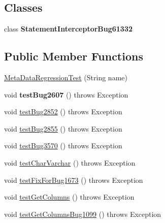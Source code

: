 \subsection*{Classes}
\begin{DoxyCompactItemize}
\item 
class {\bfseries Statement\+Interceptor\+Bug61332}
\end{DoxyCompactItemize}
\subsection*{Public Member Functions}
\begin{DoxyCompactItemize}
\item 
\mbox{\hyperlink{classtestsuite_1_1regression_1_1_meta_data_regression_test_aaba5b0477f0c35256919f9c00a28c461}{Meta\+Data\+Regression\+Test}} (String name)
\item 
\mbox{\label{classtestsuite_1_1regression_1_1_meta_data_regression_test_a2b9dcc0e397f42daa33e068203ec5277}} 
void {\bfseries test\+Bug2607} ()  throws Exception 
\item 
void \mbox{\hyperlink{classtestsuite_1_1regression_1_1_meta_data_regression_test_a37ae44d17afdb072e212dace2d333db9}{test\+Bug2852}} ()  throws Exception 
\item 
void \mbox{\hyperlink{classtestsuite_1_1regression_1_1_meta_data_regression_test_a7575c81c706f7b3eb33eafce244b371a}{test\+Bug2855}} ()  throws Exception 
\item 
void \mbox{\hyperlink{classtestsuite_1_1regression_1_1_meta_data_regression_test_a6b6d260139fb71288f93be76dac3f047}{test\+Bug3570}} ()  throws Exception 
\item 
void \mbox{\hyperlink{classtestsuite_1_1regression_1_1_meta_data_regression_test_a34109c03092379ea3c085035c26f8343}{test\+Char\+Varchar}} ()  throws Exception 
\item 
void \mbox{\hyperlink{classtestsuite_1_1regression_1_1_meta_data_regression_test_ab44999b95186ac7d583472c97d1fe24c}{test\+Fix\+For\+Bug1673}} ()  throws Exception 
\item 
void \mbox{\hyperlink{classtestsuite_1_1regression_1_1_meta_data_regression_test_a858c6ccbb86008517405f2e20ff56399}{test\+Get\+Columns}} ()  throws Exception 
\item 
void \mbox{\hyperlink{classtestsuite_1_1regression_1_1_meta_data_regression_test_af4ecb86f35850a0a32d35dd22a705df0}{test\+Get\+Columns\+Bug1099}} ()  throws Exception 

\end{DoxyCompactItemize}
